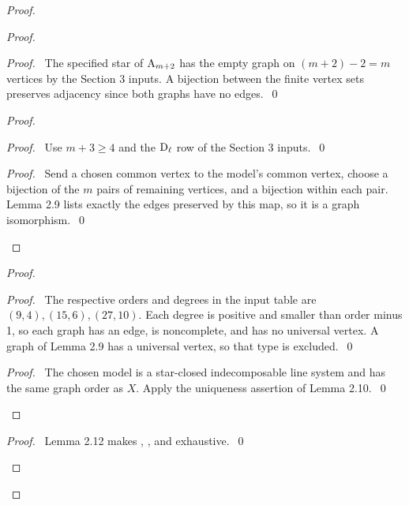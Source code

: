 \begin{proof}
 \begin{proof}
  \begin{proof}
   \pf\ The specified star of $\mathrm{A}_{m+2}$ has the empty graph on $(m+2)-2=m$ vertices
   by the Section 3 inputs. A bijection between the finite vertex sets preserves
   adjacency since both graphs have no edges.~\qed
  \end{proof}
  \begin{proof}
   \begin{proof}\pf\ Use $m+3\geq4$ and the $\mathrm{D}_\ell$ row of the Section 3 inputs.~\qed\end{proof}
   \qedstep
   \begin{proof}
    \pf\ Send a chosen common vertex to the model's common vertex, choose a bijection
    of the $m$ pairs of remaining vertices, and a bijection within each pair.
    Lemma 2.9 lists exactly the edges preserved by this map, so it is a graph isomorphism.~\qed
   \end{proof}
  \end{proof}
  \begin{proof}
   \begin{proof}
    \pf\ The respective orders and degrees in the input table are $(9,4),(15,6),(27,10)$.
    Each degree is positive and smaller than order minus 1, so each graph has an edge, is
    noncomplete, and has no universal vertex. A graph of Lemma 2.9 has a universal
    vertex, so that type is excluded.~\qed
   \end{proof}
   \qedstep
   \begin{proof}
    \pf\ The chosen model is a star-closed indecomposable line system and has the same
    graph order as $X$. Apply the uniqueness assertion of Lemma 2.10.~\qed
   \end{proof}
  \end{proof}
  \qedstep
  \begin{proof}\pf\ Lemma 2.12 makes , , and  exhaustive.~\qed\end{proof}
 \end{proof}


\end{proof}
